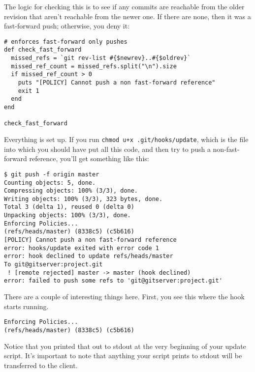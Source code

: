 \documentclass[a4paper]{book}
\begin{document}
The logic for checking this is to see if any commits are reachable from the older revision that aren't reachable from the newer one. If there are none, then it was a fast-forward push; otherwise, you deny it:

\begin{shaded}\begin{verbatim}
# enforces fast-forward only pushes
def check_fast_forward
  missed_refs = `git rev-list #{$newrev}..#{$oldrev}`
  missed_ref_count = missed_refs.split("\n").size
  if missed_ref_count > 0
    puts "[POLICY] Cannot push a non fast-forward reference"
    exit 1
  end
end

check_fast_forward
\end{verbatim}\end{shaded}

Everything is set up. If you run \texttt{chmod u+x .git/hooks/update}, which is the file into which you should have put all this code, and then try to push a non-fast-forward reference, you'll get something like this:

\begin{shaded}\begin{verbatim}
$ git push -f origin master
Counting objects: 5, done.
Compressing objects: 100% (3/3), done.
Writing objects: 100% (3/3), 323 bytes, done.
Total 3 (delta 1), reused 0 (delta 0)
Unpacking objects: 100% (3/3), done.
Enforcing Policies...
(refs/heads/master) (8338c5) (c5b616)
[POLICY] Cannot push a non fast-forward reference
error: hooks/update exited with error code 1
error: hook declined to update refs/heads/master
To git@gitserver:project.git
 ! [remote rejected] master -> master (hook declined)
error: failed to push some refs to 'git@gitserver:project.git'
\end{verbatim}\end{shaded}

There are a couple of interesting things here. First, you see this where the hook starts running.

\begin{shaded}\begin{verbatim}
Enforcing Policies...
(refs/heads/master) (8338c5) (c5b616)
\end{verbatim}\end{shaded}

Notice that you printed that out to stdout at the very beginning of your update script. It's important to note that anything your script prints to stdout will be transferred to the client.
\end{document}
